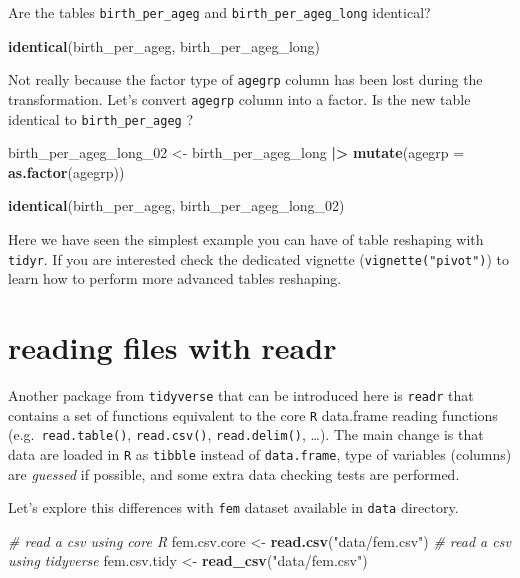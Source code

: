 \documentclass[
]{book}
\newenvironment{Shaded}{\begin{snugshade}}{\end{snugshade}}
\newcommand{\AttributeTok}[1]{\textcolor[rgb]{0.13,0.29,0.53}{#1}}
\newcommand{\CommentTok}[1]{\textcolor[rgb]{0.56,0.35,0.01}{\textit{#1}}}
\newcommand{\FunctionTok}[1]{\textcolor[rgb]{0.13,0.29,0.53}{\textbf{#1}}}
\newcommand{\NormalTok}[1]{#1}
\newcommand{\OtherTok}[1]{\textcolor[rgb]{0.56,0.35,0.01}{#1}}
\newcommand{\SpecialCharTok}[1]{\textcolor[rgb]{0.81,0.36,0.00}{\textbf{#1}}}
\newcommand{\StringTok}[1]{\textcolor[rgb]{0.31,0.60,0.02}{#1}}
\begin{document}
Are the tables \texttt{birth\_per\_ageg} and \texttt{birth\_per\_ageg\_long} identical?

\begin{Shaded}
\begin{Highlighting}[]
\FunctionTok{identical}\NormalTok{(birth\_per\_ageg, birth\_per\_ageg\_long)}
\end{Highlighting}
\end{Shaded}

Not really because the factor type of \texttt{agegrp} column has been lost during the transformation.
Let's convert \texttt{agegrp} column into a factor. Is the new table identical to \texttt{birth\_per\_ageg} ?

\begin{Shaded}
\begin{Highlighting}[]
\NormalTok{birth\_per\_ageg\_long\_02 }\OtherTok{\textless{}{-}}
\NormalTok{  birth\_per\_ageg\_long }\SpecialCharTok{|\textgreater{}}
  \FunctionTok{mutate}\NormalTok{(}\AttributeTok{agegrp =} \FunctionTok{as.factor}\NormalTok{(agegrp))}

\FunctionTok{identical}\NormalTok{(birth\_per\_ageg, birth\_per\_ageg\_long\_02)}
\end{Highlighting}
\end{Shaded}

Here we have seen the simplest example you can have of table reshaping with \texttt{tidyr}. If you are interested check the dedicated vignette (\texttt{vignette("pivot")}) to learn how to perform more advanced tables reshaping.

\section{reading files with readr}\label{reading-files-with-readr}

Another package from \texttt{tidyverse} that can be introduced here is \texttt{readr} that contains a set of functions equivalent to the core \texttt{R} data.frame reading functions (e.g.~\texttt{read.table()}, \texttt{read.csv()}, \texttt{read.delim()}, \ldots). The main change is that data are loaded in \texttt{R} as \texttt{tibble} instead of \texttt{data.frame}, type of variables (columns) are \emph{guessed} if possible, and some extra data checking tests are performed.

Let's explore this differences with \texttt{fem} dataset available in \texttt{data} directory.

\begin{Shaded}
\begin{Highlighting}[]
\CommentTok{\# read a csv using core R}
\NormalTok{fem.csv.core }\OtherTok{\textless{}{-}} \FunctionTok{read.csv}\NormalTok{(}\StringTok{"data/fem.csv"}\NormalTok{)}
\CommentTok{\# read a csv using tidyverse}
\NormalTok{fem.csv.tidy }\OtherTok{\textless{}{-}} \FunctionTok{read\_csv}\NormalTok{(}\StringTok{"data/fem.csv"}\NormalTok{)}
\end{Highlighting}
\end{Shaded}
\end{document}
